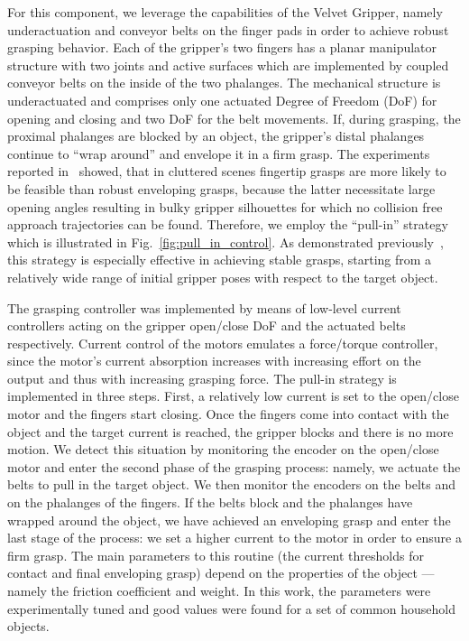 %
For this component, we leverage the capabilities of the Velvet Gripper, namely underactuation and
conveyor belts on the finger pads in order to achieve robust grasping behavior. Each of
the gripper’s two fingers has a planar manipulator structure with two joints and active surfaces
which are implemented by coupled conveyor belts on the inside of the two phalanges. The mechanical
structure is underactuated and comprises only one actuated Degree of Freedom (DoF) for opening and
closing and two DoF for the belt movements.  If, during grasping, the proximal phalanges are blocked
by an object, the gripper’s distal phalanges continue to ``wrap around'' and envelope it in a firm
grasp.  The experiments reported in~\cite{Krug14a} showed, that in cluttered scenes fingertip
grasps are more likely to be feasible than robust enveloping grasps, because the latter necessitate
large opening angles resulting in bulky gripper silhouettes for which no collision free approach
trajectories can be found. Therefore, we employ the ``pull-in'' strategy which is illustrated in
Fig.~\ref{fig:pull_in_control}. As demonstrated previously~\cite{Krug14a}, this strategy is especially effective in achieving stable
grasps, starting from a relatively wide range of initial gripper poses with respect to the target object. 
\par
The grasping controller was implemented by means of low-level current controllers acting on the gripper open/close DoF and the actuated belts respectively.
Current control of the motors emulates a force/torque controller, since the motor's current absorption increases with increasing effort on the output and thus with increasing grasping force.
The pull-in strategy is implemented in three steps.
First, a relatively low current is set to the open/close motor and the fingers start closing. 
Once the fingers come into contact with the object and the target current is reached, the gripper blocks and there is no more motion.
We detect this situation by monitoring the encoder on the open/close motor and enter the second phase of the grasping process: namely, we actuate the belts to pull in the target object.
We then monitor the encoders on the belts and on the phalanges of the fingers. 
If the belts block and the phalanges have wrapped around the object, we have achieved an enveloping grasp and enter the last stage of the process: we set a higher current to the motor in order to ensure a firm grasp. 
The main parameters to this routine (the current thresholds for contact and final enveloping grasp) depend on the properties of the object --- namely the friction coefficient and weight.
In this work, the parameters were experimentally tuned and good values were found for a set of common household objects.
